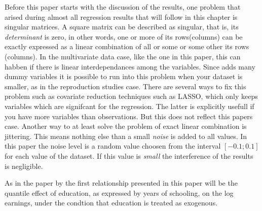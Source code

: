 \documentclass[12pt,a4paper]{article}
\begin{document}
Before this paper starts with the discussion of the results, one problem
that arised during almost all regression results that will follow in
this chapter is singular matrices. A square matrix can be described as
singular, that is, its \textit{determinant} is zero, in other words, one
or more of its rows(columns) can be exactly expressed as a linear
combination of all or some or some other its rows (columns). In the
multivariate data case, like the one in this paper, this can habben if
there is linear interdependances among the variables. Since
\textcite{brunello} adds many dummy variables it is possible to run into
this problem when your dataset is smaller, as in the reproduction
studies case. There are several ways to fix this problem such as
covariate reduction techniques such as LASSO, which only keeps variables
which are signifcant for the regression. The latter is explicitly
usefull if you have more variables than observations. But this does not
reflect this papers case. Another way to at least solve the problem of
exact linear combination is jittering. This means nothing else than a
small \textit{noise} is added to all values. In this paper the noise
level is a random value choosen from the interval \([-0.1;0.1]\) for
each value of the dataset. If this value is \textit{small} the
interference of the results is negligible.

As in the paper by \textcite{brunello} the first relationship presented
in this paper will be the quantile effect of education, as expressed by
years of schooling, on the log earnings, under the condtion that
education is treated as exogenous.
\end{document}
